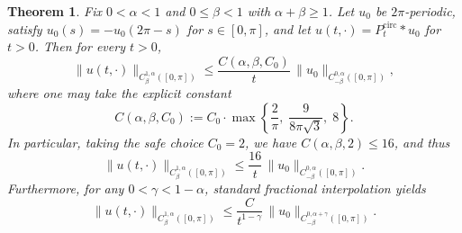 \documentclass{amsart}
\newtheorem{theorem}{Theorem}[section]
\begin{document}
\begin{theorem}\label{T:semigroup-weighted}
Fix $0<\alpha<1$ and $0\le\beta<1$ with $\alpha+\beta\ge 1$. Let \(u_0\) be \(2\pi\)-periodic, satisfy \(u_0(s)=-u_0(2\pi-s)\) for \(s\in[0,\pi]\), and let \(u(t,\cdot)=P^{\mathrm{circ}}_t * u_0\) for \(t>0\). Then for every \(t>0\),
\[
\|u(t,\cdot)\|_{C^{1,\alpha}_\beta([0,\pi])}
\le \frac{C(\alpha,\beta,C_0)}{t}\,\|u_0\|_{C^{0,\alpha}_{-\beta}([0,\pi])},
\]
where one may take the explicit constant
\[
C(\alpha,\beta,C_0)
:= C_0\cdot\max\left\{\frac{2}{\pi},\; \frac{9}{8\pi\sqrt3},\; 8\right\}.
\]
In particular, taking the safe choice \(C_0=2\), we have
$C(\alpha,\beta,2) \le 16$, and thus
\[
\|u(t,\cdot)\|_{C^{1,\alpha}_\beta([0,\pi])}
\le \frac{16}{t}\,\|u_0\|_{C^{0,\alpha}_{-\beta}([0,\pi])}.
\]
Furthermore, for any $0<\gamma<1-\alpha$, standard fractional interpolation yields
\[
\|u(t,\cdot)\|_{C^{1,\alpha}_\beta([0,\pi])}
\le \frac{C}{t^{1-\gamma}}\,\|u_0\|_{C^{0,\alpha+\gamma}_{-\beta}([0,\pi])}.
\]
\end{theorem}
\end{document}
